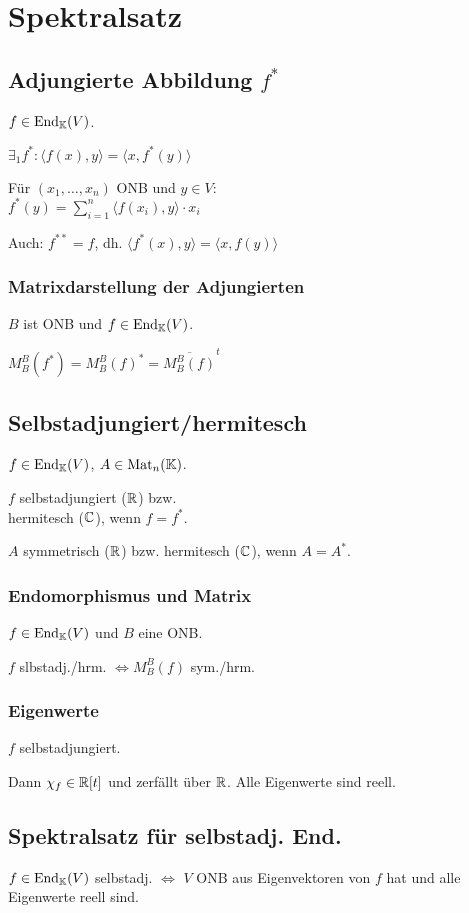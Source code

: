 \section*{Spektralsatz}

\subsection*{Adjungierte Abbildung $f^*$}
$f\in\operatorname{End}_{\mathbb{K}}(V)$.

$\exists_1 f^*:\langle f(x),y \rangle = \langle x, f^*(y) \rangle$

Für $(x_1,\dots,x_n)$ ONB und $y\in V$: \\
$\displaystyle f^*(y)=\sum_{i=1}^n \langle f(x_i),y \rangle \cdot x_i$

Auch: $f^{**}=f$, dh. $\langle f^*(x),y\rangle = \langle x,f(y)\rangle$

\subsubsection*{Matrixdarstellung der Adjungierten}
$B$ ist ONB und $f\in\operatorname{End}_{\mathbb{K}}(V)$.

$M_B^B(f^*)=M_B^B(f)^* = \overline{M_B^B(f)}^t$

\subsection*{Selbstadjungiert/hermitesch}
$f\in\operatorname{End}_{\mathbb{K}}(V)$, $A\in\operatorname{Mat}_n(\mathbb{K})$.

$f$ selbstadjungiert ($\mathbb{R}$) bzw. \\ hermitesch ($\mathbb{C}$), wenn $f=f^*$.

$A$ symmetrisch ($\mathbb{R}$) bzw. hermitesch ($\mathbb{C}$), wenn $A=A^*$.

\subsubsection*{Endomorphismus und Matrix}
$f\in\operatorname{End}_{\mathbb{K}}(V)$ und $B$ eine ONB.

$f$ slbstadj./hrm. $\iff M_B^B(f)$ sym./hrm.

\subsubsection*{Eigenwerte}
$f$ selbstadjungiert.

Dann $\chi_f \in\mathbb{R}[t]$ und zerfällt über $\mathbb{R}$.
Alle Eigenwerte sind reell.

\subsection*{Spektralsatz für selbstadj. End.}
$f\in\operatorname{End}_{\mathbb{K}}(V)$ selbstadj. $\iff$ $V$ ONB aus Eigenvektoren von $f$ hat
und alle Eigenwerte reell sind.

